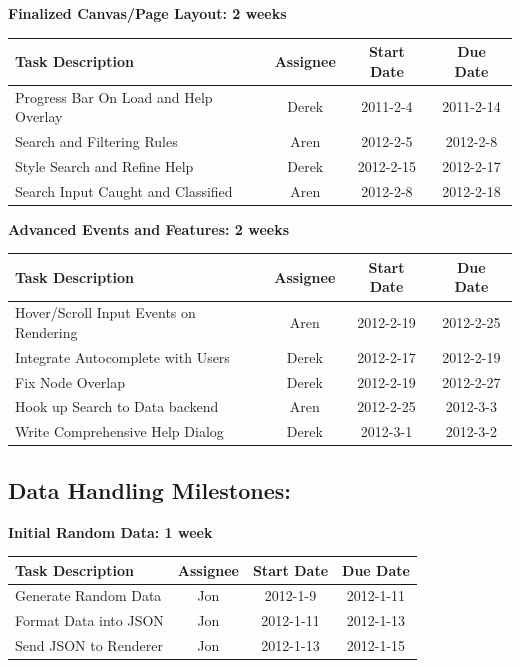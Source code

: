 \documentclass[12pt, letterpaper]{article}
\begin{document}
  \begin{center}
		{\bf Finalized Canvas/Page Layout: 2 weeks}
    \begin{tabular}{| p{8.3cm} || c | c | c | }
      \hline
      Task Description & Assignee & Start Date & Due Date \\
      \hline
		Progress Bar On Load and Help Overlay & Derek & 2011-2-4 & 2011-2-14 \\
	    Search and Filtering Rules & Aren & 2012-2-5 & 2012-2-8 \\
	    Style Search and Refine Help & Derek & 2012-2-15 & 2012-2-17 \\
	    Search Input Caught and Classified & Aren & 2012-2-8 & 2012-2-18 \\
      \hline
    \end{tabular}
  \end{center}

  \begin{center}
		{\bf Advanced Events and Features: 2 weeks}
    \begin{tabular}{| p{8.3cm} || c | c | c | }
      \hline
      Task Description & Assignee & Start Date & Due Date \\
      \hline
	    Hover/Scroll Input Events on Rendering & Aren & 2012-2-19 & 2012-2-25 \\
        Integrate Autocomplete with Users & Derek & 2012-2-17 & 2012-2-19 \\
	    Fix Node Overlap & Derek & 2012-2-19 & 2012-2-27 \\
	    Hook up Search to Data backend & Aren & 2012-2-25 & 2012-3-3 \\
	    Write Comprehensive Help Dialog & Derek & 2012-3-1 & 2012-3-2 \\
      \hline
    \end{tabular}
  \end{center}

  	\subsection{Data Handling Milestones:}

  \begin{center}
		{\bf Initial Random Data: 1 week}
    \begin{tabular}{| p{8.3cm} || c | c | c | }
      \hline
      Task Description & Assignee & Start Date & Due Date \\
      \hline
	    Generate Random Data & Jon & 2012-1-9 & 2012-1-11 \\
	    Format Data into JSON & Jon & 2012-1-11 & 2012-1-13 \\
	    Send JSON to Renderer & Jon & 2012-1-13 & 2012-1-15 \\
      \hline
    \end{tabular}
  \end{center}
\end{document}
